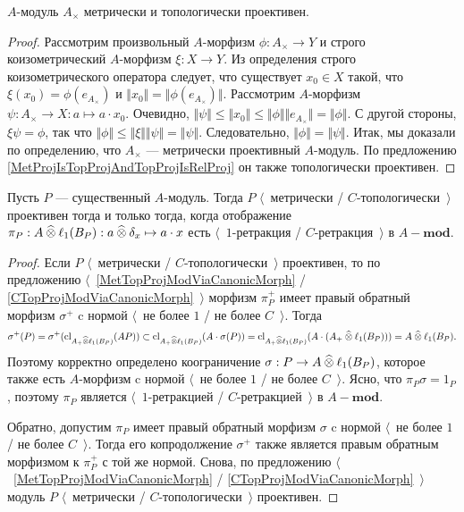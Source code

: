 \begin{proposition}\label{UnitalAlgIsMetTopProj} $A$-модуль $A_\times$ метрически и топологически проективен.
\end{proposition} 
\begin{proof} Рассмотрим произвольный $A$-морфизм $\phi:A_\times\to Y$ и строго коизометрический $A$-морфизм $\xi:X\to Y$. Из определения строго коизометрического оператора следует, что существует $x_0\in X$ такой, что $\xi(x_0)=\phi(e_{A_\times})$ и $\Vert x_0\Vert=\Vert\phi(e_{A_\times})\Vert$. Рассмотрим $A$-морфизм $\psi:A_\times\to X:a\mapsto a\cdot x_0$. Очевидно, $\Vert\psi\Vert\leq\Vert x_0\Vert\leq\Vert\phi\Vert\Vert e_{A_\times}\Vert=\Vert\phi\Vert$. С другой стороны, $\xi\psi=\phi$, так что $\Vert\phi\Vert\leq\Vert\xi\Vert\Vert\psi\Vert=\Vert\psi\Vert$. Следовательно, $\Vert\phi\Vert=\Vert\psi\Vert$. Итак, мы доказали по определению, что $A_\times$ --- метрически проективный $A$-модуль. По предложению \ref{MetProjIsTopProjAndTopProjIsRelProj} он также топологически проективен.
\end{proof}

\begin{proposition}\label{NonDegenMetTopProjCharac} Пусть $P$ --- существенный $A$-модуль. Тогда $P$ $\langle$~метрически / $C$-топологически~$\rangle$ проективен тогда и только тогда, когда отображение $\pi_P:A\mathbin{\widehat{\otimes}}\ell_1(B_P):a\mathbin{\widehat{\otimes}}\delta_x\mapsto a\cdot x$ есть $\langle$~$1$-ретракция / $C$-ретракция~$\rangle$ в $A-\mathbf{mod}$.
\end{proposition} 
\begin{proof}
Если $P$ $\langle$~метрически / $C$-топологически~$\rangle$ проективен, то по предложению  $\langle$~\ref{MetTopProjModViaCanonicMorph} / \ref{CTopProjModViaCanonicMorph}~$\rangle$ морфизм $\pi_P^+$ имеет правый обратный морфизм $\sigma^+$ c нормой $\langle$~не более $1$ / не более $C$~$\rangle$. Тогда 
$$
\sigma^+(P)=\sigma^+(\operatorname{cl}_{A_+\mathbin{\widehat{\otimes}}\ell_1(B_P)}(AP))\subset \operatorname{cl}_{A_+\mathbin{\widehat{\otimes}}\ell_1(B_P)}(A\cdot\sigma(P))=
\operatorname{cl}_{A_+\mathbin{\widehat{\otimes}}\ell_1(B_P)}(A\cdot(A_+\mathbin{\widehat{\otimes}}\ell_1(B_P)))=A\mathbin{\widehat{\otimes}}\ell_1(B_P).
$$
Поэтому корректно определено коограничение $\sigma:P\to A\mathbin{\widehat{\otimes}}\ell_1(B_P)$, которое также есть $A$-морфизм c нормой $\langle$~не более $1$ / не более $C$~$\rangle$. Ясно, что $\pi_P\sigma=1_P$, поэтому $\pi_P$ является $\langle$~$1$-ретракцией / $C$-ретракцией~$\rangle$ в $A-\mathbf{mod}$.

Обратно, допустим $\pi_P$ имеет правый обратный морфизм $\sigma$ c нормой $\langle$~не более $1$ / не более $C$~$\rangle$. Тогда его копродолжение $\sigma^+$ также является правым обратным морфизмом к $\pi_P^+$ с той же нормой. Снова, по предложению $\langle$~\ref{MetTopProjModViaCanonicMorph} / \ref{CTopProjModViaCanonicMorph}~$\rangle$ модуль $P$ $\langle$~метрически / $C$-топологически~$\rangle$ проективен. 
\end{proof}

